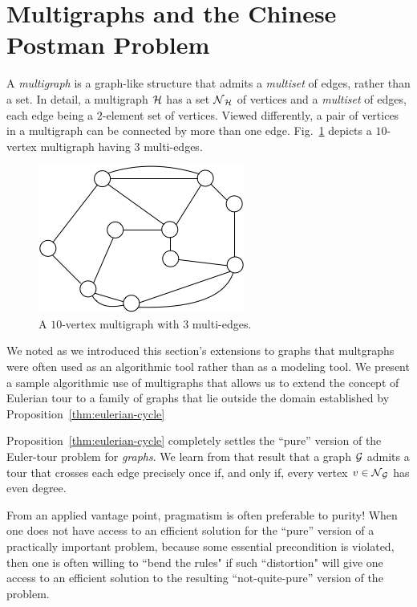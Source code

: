 \section{Multigraphs and the Chinese Postman Problem}
\label{sec:multigraphs}
 

A {\it multigraph} is a graph-like structure that admits a {\em multiset} of edges, rather than a set.  In detail, a multigraph $\mbox{$\cal H$}$ has a set $\mbox{$\cal N$}_{\mbox{{\scriptsize $\cal H$}}}$ of vertices and a {\em multiset} of edges, each edge being a $2$-element set of vertices.  Viewed differently, a pair of vertices in a multigraph can be connected by more than one edge.  Fig.~\ref{fig:EulerianFinal} depicts a $10$-vertex multigraph
having $3$ multi-edges.
\begin{figure}[hbt]
\begin{center}
       \includegraphics[scale=0.4]{FiguresGraph/EulerienFinal}
       \caption{A $10$-vertex multigraph with $3$ multi-edges.}
              \label{fig:EulerianFinal}
\end{center}
\end{figure}

\smallskip

We noted as we introduced this section's extensions to graphs that multgraphs were often used as an algorithmic tool rather than as a modeling tool.  We present a sample algorithmic use of multigraphs that allows us to extend the concept of Eulerian tour to a family of graphs that lie outside the domain established by Proposition~\ref{thm:eulerian-cycle}


\bigskip

Proposition~\ref{thm:eulerian-cycle} completely settles the ``pure'' version of the Euler-tour problem for {\em graphs}.  We learn from that result that a graph $\mbox{$\cal G$}$ admits a tour that crosses each edge precisely once if, and only if, every vertex $v \in \mbox{$\cal N$}_{\mbox{{\scriptsize $\cal G$}}}$ has even degree.

\medskip

From an applied vantage point, pragmatism is often preferable to purity!  When one does not have access to an efficient solution for the ``pure'' version of a practically important problem, because some essential precondition is violated, then one is often willing to ``bend the rules" if such ``distortion" will give one access to an efficient solution to the resulting ``not-quite-pure'' version of the problem. 

